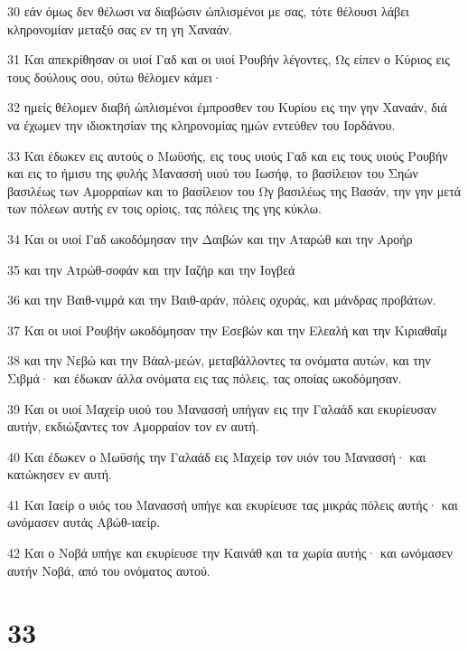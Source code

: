 \par 30 εάν όμως δεν θέλωσι να διαβώσιν ώπλισμένοι με σας, τότε θέλουσι λάβει κληρονομίαν μεταξύ σας εν τη γη Χαναάν.
\par 31 Και απεκρίθησαν οι υιοί Γαδ και οι υιοί Ρουβήν λέγοντες, Ως είπεν ο Κύριος εις τους δούλους σου, ούτω θέλομεν κάμει·
\par 32 ημείς θέλομεν διαβή ώπλισμένοι έμπροσθεν του Κυρίου εις την γην Χαναάν, διά να έχωμεν την ιδιοκτησίαν της κληρονομίας ημών εντεύθεν του Ιορδάνου.
\par 33 Και έδωκεν εις αυτούς ο Μωϋσής, εις τους υιούς Γαδ και εις τους υιούς Ρουβήν και εις το ήμισυ της φυλής Μανασσή υιού του Ιωσήφ, το βασίλειον του Σηών βασιλέως των Αμορραίων και το βασίλειον του Ωγ βασιλέως της Βασάν, την γην μετά των πόλεων αυτής εν τοις ορίοις, τας πόλεις της γης κύκλω.
\par 34 Και οι υιοί Γαδ ωκοδόμησαν την Δαιβών και την Αταρώθ και την Αροήρ
\par 35 και την Ατρώθ-σοφάν και την Ιαζήρ και την Ιογβεά
\par 36 και την Βαιθ-νιμρά και την Βαιθ-αράν, πόλεις οχυράς, και μάνδρας προβάτων.
\par 37 Και οι υιοί Ρουβήν ωκοδόμησαν την Εσεβών και την Ελεαλή και την Κιριαθαΐμ
\par 38 και την Νεβώ και την Βάαλ-μεών, μεταβάλλοντες τα ονόματα αυτών, και την Σιβμά· και έδωκαν άλλα ονόματα εις τας πόλεις, τας οποίας ωκοδόμησαν.
\par 39 Και οι υιοί Μαχείρ υιού του Μανασσή υπήγαν εις την Γαλαάδ και εκυρίευσαν αυτήν, εκδιώξαντες τον Αμορραίον τον εν αυτή.
\par 40 Και έδωκεν ο Μωϋσής την Γαλαάδ εις Μαχείρ τον υιόν του Μανασσή· και κατώκησεν εν αυτή.
\par 41 Και Ιαείρ ο υιός του Μανασσή υπήγε και εκυρίευσε τας μικράς πόλεις αυτής· και ωνόμασεν αυτάς Αβώθ-ιαείρ.
\par 42 Και ο Νοβά υπήγε και εκυρίευσε την Καινάθ και τα χωρία αυτής· και ωνόμασεν αυτήν Νοβά, από του ονόματος αυτού.

\chapter{33}

